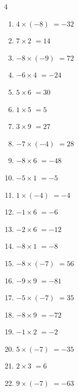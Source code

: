 \begin{multicols}{4}
\begin{enumerate}
  \item $4\times (-8)$
        $=-32$

  \item $7\times 2$
        $=14$

  \item $-8\times (-9)$
        $=72$

  \item $-6\times 4$
        $=-24$

  \item $5\times 6$
        $=30$

  \item $1\times 5$
        $=5$

  \item $3\times 9$
        $=27$

  \item $-7\times (-4)$
        $=28$

  \item $-8\times 6$
        $=-48$

  \item $-5\times 1$
        $=-5$

  \item $1\times (-4)$
        $=-4$

  \item $-1\times 6$
        $=-6$

  \item $-2\times 6$
        $=-12$

  \item $-8\times 1$
        $=-8$

\columnbreak %

  \item $-8\times (-7)$
        $=56$

  \item $-9\times 9$
        $=-81$

  \item $-5\times (-7)$
        $=35$

  \item $-8\times 9$
        $=-72$

  \item $-1\times 2$
        $=-2$

  \item $5\times (-7)$
        $=-35$

  \item $2\times 3$
        $=6$

  \item $9\times (-7)$
        $=-63$


\end{enumerate}
\end{multicols}
